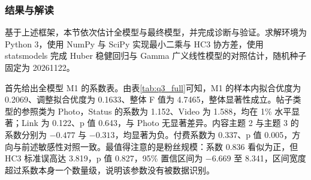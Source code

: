 \subsubsection{结果与解读}

基于上述框架，本节依次估计全模型与最终模型，并完成诊断与验证。求解环境为 Python 3，使用 NumPy 与 SciPy 实现最小二乘与 HC3 协方差，使用 statsmodels 完成 Huber 稳健回归与 Gamma 广义线性模型的对照估计，随机种子固定为 20261122。

首先给出全模型 M1 的系数表。由表\ref{tab:q3_full}可知，M1 的样本内拟合优度为 0.2069、调整拟合优度为 0.1633、整体 F 值为 4.7465，整体显著性成立。帖子类型的参照类为 Photo，Status 的系数为 1.152、Video 为 1.588，均在 1\% 水平显著；Link 为 0.122、p 值 0.643，与 Photo 无显著差异。内容主题 2 与主题 3 的系数分别为 $-0.477$ 与 $-0.313$，均显著为负。付费系数为 0.337、p 值 0.005，方向与前述敏感性对照一致。最值得注意的是粉丝规模：系数 0.836 看似为正，但 HC3 标准误高达 3.819，p 值 0.827，95\% 置信区间为 $-6.669$ 至 8.341，区间宽度超过系数本身一个数量级，说明该参数没有被数据识别。

